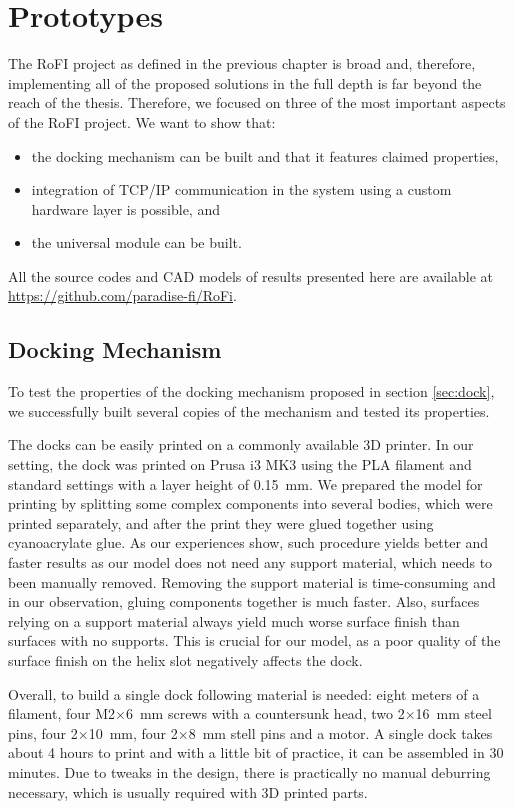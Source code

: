 \chapter{Prototypes}\label{chap:prototypes}

The RoFI project as defined in the previous chapter is broad and, therefore,
implementing all of the proposed solutions in the full depth is far beyond the
reach of the thesis. Therefore, we focused on three of the most important
aspects of the RoFI project. We want to show that:
\begin{itemize}
    \item the docking mechanism can be built and that it features claimed
    properties,
    \item integration of TCP/IP communication in the system using a custom
    hardware layer is possible, and
    \item the universal module can be built.
\end{itemize}

All the source codes and CAD models of results presented here are available at
\url{https://github.com/paradise-fi/RoFi}.

\section{Docking Mechanism}

To test the properties of the docking mechanism proposed in section
\ref{sec:dock}, we successfully built several copies of the mechanism and tested
its properties.

The docks can be easily printed on a commonly available 3D printer. In our
setting, the dock was printed on Prusa i3 MK3 using the PLA filament and
standard settings with a layer height of 0.15~mm. We prepared the model for
printing by splitting some complex components into several bodies, which were
printed separately, and after the print they were glued together using
cyanoacrylate glue. As our experiences show, such procedure yields better and
faster results as our model does not need any support material, which needs to
been manually removed. Removing the support material is time-consuming and in
our observation, gluing components together is much faster. Also, surfaces
relying on a support material always yield much worse surface finish than
surfaces with no supports. This is crucial for our model, as a poor quality of
the surface finish on the helix slot negatively affects the dock.

Overall, to build a single dock following material is needed: eight meters of a
filament, four M2$\times$6~mm screws with a countersunk head, two 2$\times$16~mm
steel pins, four 2$\times$10~mm, four 2$\times$8~mm stell pins and a motor.
A single dock takes about 4 hours to print and with a little bit of practice, it
can be assembled in 30 minutes. Due to tweaks in the design, there is
practically no manual deburring necessary, which is usually required with 3D
printed parts.

